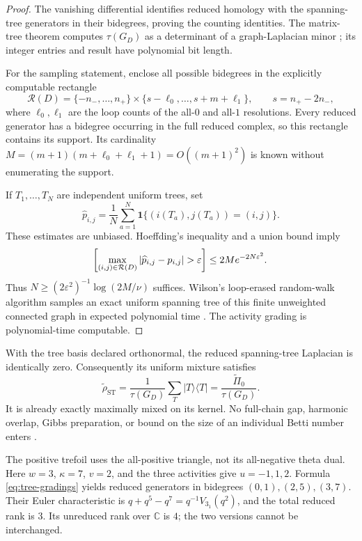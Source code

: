 \documentclass[a4paper,onecolumn,unpublished]{quantumarticle}
\let\Pr\relax
\DeclareMathOperator*{\Pr}{\mathbf{Pr}}
\theoremstyle{plain}
\theoremstyle{definition}
\theoremstyle{definition}
\numberwithin{equation}{section}
\begin{document}
\begin{proof}
The vanishing differential identifies reduced homology with the spanning-tree generators in their bidegrees, proving the counting identities. The matrix-tree theorem computes \(\tau(G_D)\) as a determinant of a graph-Laplacian minor \cite{Kirchhoff1847,KleeStamps2019}; its integer entries and result have polynomial bit length.

For the sampling statement, enclose all possible bidegrees in the explicitly computable rectangle
\[
 \mathcal R(D)=
 \{-n_-,\ldots,n_+\}\times
 \{s-\ell_0,\ldots,s+m+\ell_1\},
 \qquad s=n_+-2n_-,
\]
where \(\ell_0,\ell_1\) are the loop counts of the all-\(0\) and all-\(1\) resolutions. Every reduced generator has a bidegree occurring in the full reduced complex, so this rectangle contains its support. Its cardinality
\(M=(m+1)(m+\ell_0+\ell_1+1)=O((m+1)^2)\) is known without enumerating the support.

If \(T_1,\ldots,T_N\) are independent uniform trees, set
\[
 \widehat p_{i,j}=\frac1N\sum_{a=1}^N
 \mathbf1\{(i(T_a),j(T_a))=(i,j)\}.
\]
These estimates are unbiased. Hoeffding's inequality and a union bound imply
\[
 \Pr\!\left[\max_{(i,j)\in\mathcal R(D)}
 |\widehat p_{i,j}-p_{i,j}|>\varepsilon\right]
 \le 2M e^{-2N\varepsilon^2}.
\]
Thus \(N\ge(2\varepsilon^2)^{-1}\log(2M/\nu)\) suffices. Wilson's loop-erased random-walk algorithm samples an exact uniform spanning tree of this finite unweighted connected graph in expected polynomial time \cite{Wilson96}. The activity grading is polynomial-time computable.
\end{proof}

With the tree basis declared orthonormal, the reduced spanning-tree Laplacian is identically zero. Consequently its uniform mixture satisfies
\[
 \widetilde\rho_{\mathrm{ST}}
 =\frac1{\tau(G_D)}\sum_T |T\rangle\langle T|
 =\frac{\widetilde\Pi_0}{\tau(G_D)}.
\]
It is already exactly maximally mixed on its kernel. No full-chain gap, harmonic overlap, Gibbs preparation, or bound on the size of an individual Betti number enters .

The positive trefoil uses the all-positive triangle, not its all-negative theta dual. Here \(w=3\), \(\kappa=7\), \(v=2\), and the three activities give \(u=-1,1,2\). Formula \cref{eq:tree-gradings} yields reduced generators in bidegrees \((0,1),(2,5),(3,7)\). Their Euler characteristic is \(q+q^5-q^7=q^{-1}V_{3_1}(q^2)\), and the total reduced rank is \(3\). Its unreduced rank over \(\mathbb C\) is \(4\); the two versions cannot be interchanged.
\end{document}
